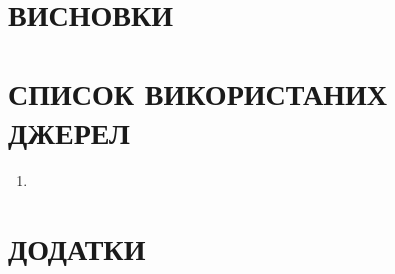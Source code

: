 \documentclass{article}
\begin{document}
    \section{ВИСНОВКИ}
    \newpage
    \section{СПИСОК ВИКОРИСТАНИХ ДЖЕРЕЛ}
    \begin{enumerate}
        \item 
    \end{enumerate}
    \newpage
    \section{ДОДАТКИ}
\end{document}
